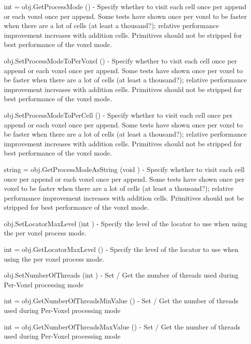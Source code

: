 \begin{DoxyItemize}
\item {\ttfamily int = obj.\-Get\-Process\-Mode ()} -\/ Specify whether to visit each cell once per append or each voxel once per append. Some tests have shown once per voxel to be faster when there are a lot of cells (at least a thousand?); relative performance improvement increases with addition cells. Primitives should not be stripped for best performance of the voxel mode.  
\item {\ttfamily obj.\-Set\-Process\-Mode\-To\-Per\-Voxel ()} -\/ Specify whether to visit each cell once per append or each voxel once per append. Some tests have shown once per voxel to be faster when there are a lot of cells (at least a thousand?); relative performance improvement increases with addition cells. Primitives should not be stripped for best performance of the voxel mode.  
\item {\ttfamily obj.\-Set\-Process\-Mode\-To\-Per\-Cell ()} -\/ Specify whether to visit each cell once per append or each voxel once per append. Some tests have shown once per voxel to be faster when there are a lot of cells (at least a thousand?); relative performance improvement increases with addition cells. Primitives should not be stripped for best performance of the voxel mode.  
\item {\ttfamily string = obj.\-Get\-Process\-Mode\-As\-String (void )} -\/ Specify whether to visit each cell once per append or each voxel once per append. Some tests have shown once per voxel to be faster when there are a lot of cells (at least a thousand?); relative performance improvement increases with addition cells. Primitives should not be stripped for best performance of the voxel mode.  
\item {\ttfamily obj.\-Set\-Locator\-Max\-Level (int )} -\/ Specify the level of the locator to use when using the per voxel process mode.  
\item {\ttfamily int = obj.\-Get\-Locator\-Max\-Level ()} -\/ Specify the level of the locator to use when using the per voxel process mode.  
\item {\ttfamily obj.\-Set\-Number\-Of\-Threads (int )} -\/ Set / Get the number of threads used during Per-\/\-Voxel processing mode  
\item {\ttfamily int = obj.\-Get\-Number\-Of\-Threads\-Min\-Value ()} -\/ Set / Get the number of threads used during Per-\/\-Voxel processing mode  
\item {\ttfamily int = obj.\-Get\-Number\-Of\-Threads\-Max\-Value ()} -\/ Set / Get the number of threads used during Per-\/\-Voxel processing mode  

\end{DoxyItemize}
